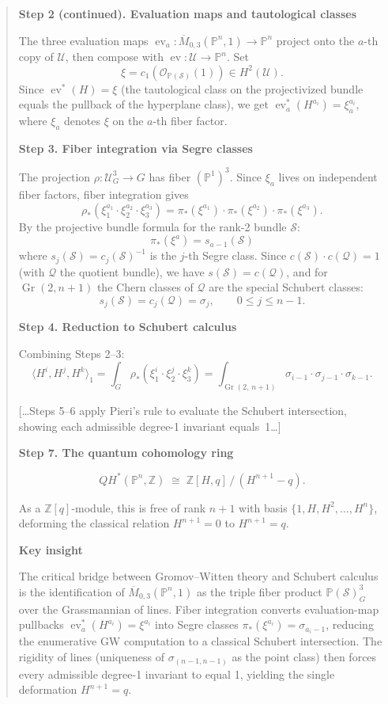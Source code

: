 \begin{quote}
\small
\textbf{Step 2 (continued). Evaluation maps and tautological classes}

The three evaluation maps $\operatorname{ev}_a: \overline{M}_{0,3}(\mathbb{P}^n,1) \to \mathbb{P}^n$ project onto the $a$-th copy of $\mathcal{U}$, then compose with $\operatorname{ev}: \mathcal{U} \to \mathbb{P}^n$. Set
$$\xi = c_1(\mathcal{O}_{\mathbb{P}(\mathcal{S})}(1)) \in H^2(\mathcal{U}).$$
Since $\operatorname{ev}^*(H) = \xi$ (the tautological class on the projectivized bundle equals the pullback of the hyperplane class), we get $\operatorname{ev}_a^*(H^{a_i}) = \xi_a^{a_i}$, where $\xi_a$ denotes $\xi$ on the $a$-th fiber factor.

\textbf{Step 3. Fiber integration via Segre classes}

The projection $\rho: \mathcal{U}^3_G \to G$ has fiber $(\mathbb{P}^1)^3$. Since $\xi_a$ lives on independent fiber factors, fiber integration gives
$$\rho_*(\xi_1^{a_1}\cdot \xi_2^{a_2}\cdot \xi_3^{a_3}) = \pi_*(\xi^{a_1})\cdot \pi_*(\xi^{a_2})\cdot \pi_*(\xi^{a_3}).$$
By the projective bundle formula for the rank-2 bundle $\mathcal{S}$:
$$\pi_*(\xi^a) = s_{a-1}(\mathcal{S})$$
where $s_j(\mathcal{S}) = c_j(\mathcal{S})^{-1}$ is the $j$-th Segre class. Since $c(\mathcal{S})\cdot c(\mathcal{Q}) = 1$ (with $\mathcal{Q}$ the quotient bundle), we have $s(\mathcal{S}) = c(\mathcal{Q})$, and for $\operatorname{Gr}(2,n+1)$ the Chern classes of $\mathcal{Q}$ are the special Schubert classes:
$$s_j(\mathcal{S}) = c_j(\mathcal{Q}) = \sigma_j, \qquad 0 \le j \le n-1.$$

\textbf{Step 4. Reduction to Schubert calculus}

Combining Steps 2--3:
$$\langle H^i, H^j, H^k\rangle_1 = \int_G \rho_*(\xi_1^i\cdot\xi_2^j\cdot\xi_3^k) = \int_{\operatorname{Gr}(2,\,n+1)} \sigma_{i-1}\cdot\sigma_{j-1}\cdot\sigma_{k-1}.$$

[\ldots Steps 5--6 apply Pieri's rule to evaluate the Schubert intersection, showing each admissible degree-1 invariant equals~1\ldots]

\textbf{Step 7. The quantum cohomology ring}

$$QH^*(\mathbb{P}^n, \mathbb{Z}) \;\cong\; \mathbb{Z}[H, q]\,\big/\,(H^{n+1} - q).$$

As a $\mathbb{Z}[q]$-module, this is free of rank $n+1$ with basis $\{1, H, H^2, \ldots, H^n\}$, deforming the classical relation $H^{n+1} = 0$ to $H^{n+1} = q$.

\textbf{Key insight}

The critical bridge between Gromov--Witten theory and Schubert calculus is the identification of $\overline{M}_{0,3}(\mathbb{P}^n, 1)$ as the triple fiber product $\mathbb{P}(\mathcal{S})^3_G$ over the Grassmannian of lines. Fiber integration converts evaluation-map pullbacks $\operatorname{ev}_a^*(H^{a_i}) = \xi^{a_i}$ into Segre classes $\pi_*(\xi^{a_i}) = \sigma_{a_i - 1}$, reducing the enumerative GW computation to a classical Schubert intersection. The rigidity of lines (uniqueness of $\sigma_{(n-1,n-1)}$ as the point class) then forces every admissible degree-1 invariant to equal 1, yielding the single deformation $H^{n+1} = q$.
\end{quote}

